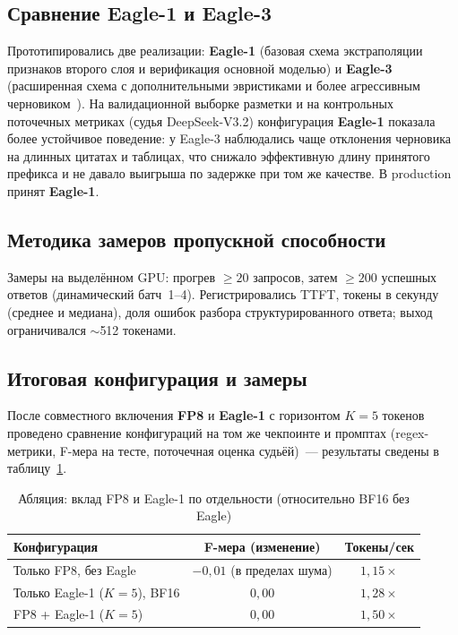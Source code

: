 \documentclass[times]{itmo-student-thesis}
\begin{document}
\subsection{Сравнение Eagle-1 и Eagle-3}

Прототипировались две реализации: \textbf{Eagle-1} (базовая схема
экстраполяции признаков второго слоя и верификация основной моделью)
и \textbf{Eagle-3} (расширенная схема с дополнительными эвристиками
и более агрессивным черновиком~\cite{eagle3-2025}). На валидационной выборке разметки
и на контрольных поточечных метриках (судья DeepSeek-V3.2) конфигурация
\textbf{Eagle-1} показала более устойчивое поведение: у Eagle-3
наблюдались чаще отклонения черновика на длинных цитатах и таблицах,
что снижало эффективную длину принятого префикса и не давало выигрыша
по задержке при том же качестве. В production принят \textbf{Eagle-1}.

\subsection{Методика замеров пропускной способности}

Замеры на выделённом GPU: прогрев ${\ge}20$ запросов, затем ${\ge}200$
успешных ответов (динамический батч~1--4). Регистрировались TTFT,
токены в секунду (среднее и медиана), доля ошибок разбора структурированного ответа;
выход ограничивался $\sim$512 токенами.

\subsection{Итоговая конфигурация и замеры}

После совместного включения \textbf{FP8} и \textbf{Eagle-1} с горизонтом
$K=5$ токенов проведено сравнение конфигураций на том же чекпоинте
и промптах (regex-метрики, F-мера на тесте, поточечная оценка судьёй)~---
результаты сведены в таблицу~\ref{tab:fp8-ablation}.

\begin{table}[h]
\caption{Абляция: вклад FP8 и Eagle-1 по отдельности (относительно BF16 без Eagle)}\label{tab:fp8-ablation}
\centering
\begin{tabular}{|l|c|c|}
\hline
\textbf{Конфигурация} & \textbf{F-мера (изменение)} & \textbf{Токены/сек} \\
\hline
Только FP8, без Eagle & $-0{,}01$ (в пределах шума) & $1{,}15\times$ \\
\hline
Только Eagle-1 ($K{=}5$), BF16 & $0{,}00$ & $1{,}28\times$ \\
\hline
FP8 + Eagle-1 ($K{=}5$) & $0{,}00$ & $1{,}50\times$ \\
\hline
\end{tabular}
\end{table}
\end{document}
